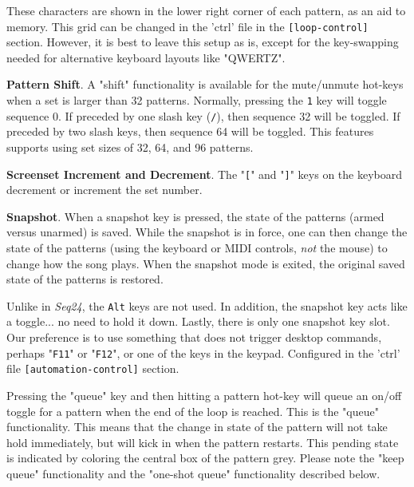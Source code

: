    These characters are shown in the lower right corner of each
   pattern, as an aid to memory.
   This grid can be changed in the 'ctrl' file in the
   \texttt{[loop-control]} section.
   However, it is best to leave this setup as is, except for the key-swapping
   needed for alternative keyboard layouts like "QWERTZ".

   \textbf{Pattern Shift}.
   A "shift" functionality is available for the
   mute/unmute hot-keys when a set is larger than 32 patterns.
   Normally, pressing the \texttt{1} key will toggle
   sequence 0.  If preceded by one slash key (\texttt{/}), then sequence 32
   will be toggled.  If preceded by two slash keys, then sequence 64 will be
   toggled.  This features supports using set sizes of 32, 64, and 96 patterns.

   \index{keys![}
   \textbf{Screenset Increment and Decrement}.
   The "\texttt{[}" and
   \index{keys!]}
   "\texttt{]}" keys on the keyboard decrement or increment the set number.

   \textbf{Snapshot}.
   When a snapshot key is pressed, the state of the patterns
   (armed versus unarmed) is saved.  While the
   snapshot is in force, one can then change the state of the patterns
   (using the keyboard or MIDI controls, \textsl{not} the mouse)
   to change how the song plays.  When the snapshot mode is exited, the
   original saved state of the patterns is restored.

   Unlike in \textsl{Seq24}, the \texttt{Alt} keys are not used.
   In addition, the snapshot key acts like a toggle... no need to hold it down.
   Lastly, there is only one snapshot key slot.
   Our preference is to use something that does not trigger desktop
   commands, perhaps "\texttt{F11}" or "\texttt{F12}", or one of the keys in
   the keypad.
   Configured in the 'ctrl' file
   \texttt{[automation-control]} section.

   Pressing the "queue" key and then hitting a pattern hot-key
   will queue an on/off toggle for a pattern when the end of the loop is
   reached.
   This is the "queue" functionality.
   This means that the change in state of the pattern will not take hold
   immediately, but will kick in when the pattern restarts.
   This pending state is indicated by coloring the central box of the
   pattern grey.
   Please note the "keep queue" functionality and
   the "one-shot queue" functionality described below.

